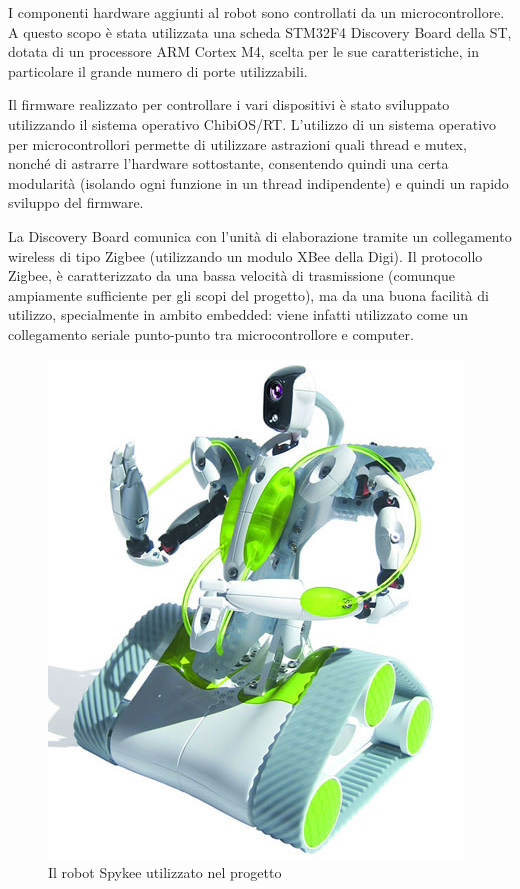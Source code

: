 I componenti hardware aggiunti al robot sono controllati da un microcontrollore. A questo scopo è stata utilizzata una scheda STM32F4 Discovery Board della ST, dotata di un processore ARM Cortex M4, scelta per le sue caratteristiche, in particolare il grande numero di porte utilizzabili.

Il firmware realizzato per controllare i vari dispositivi è stato sviluppato utilizzando il sistema operativo ChibiOS/RT\cite{chibios}. L'utilizzo di un sistema operativo per microcontrollori permette di utilizzare astrazioni quali thread e mutex, nonché di astrarre l'hardware sottostante, consentendo quindi una certa modularità (isolando ogni funzione in un thread indipendente) e quindi un rapido sviluppo del firmware.

La Discovery Board comunica con l'unità di elaborazione tramite un collegamento wireless di tipo Zigbee (utilizzando un modulo XBee della Digi). Il protocollo Zigbee, è caratterizzato da una bassa velocità di trasmissione (comunque ampiamente sufficiente per gli scopi del progetto), ma da una buona facilità di utilizzo, specialmente in ambito embedded: viene infatti utilizzato come un collegamento seriale punto-punto tra microcontrollore e computer.

\begin{figure}[h]
\centering
\includegraphics[scale=0.4]{images/spykee}
\caption{Il robot Spykee utilizzato nel progetto}
\end{figure}

